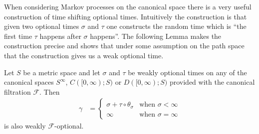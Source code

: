 When considering Markov processes on the canonical space there is a
very useful construction of time shifting optional times.  Intuitively
the construction is that given two optional times $\sigma$ and $\tau$
one constructs the random time which is ``the first time $\tau$
happens after $\sigma$ happens''.  The following Lemma makes the
construction precise and shows that under some assumption on the path
space that the construction gives us a weak optional time.
\begin{lem}\label{TimeShiftOptionalTimes}Let $S$ be a metric space and
  let $\sigma$ and $\tau$ be weakly optional times on any of the canonical
  spaces $S^\infty$, $C([0,\infty); S)$ or $D([0,\infty); S)$ provided
  with the canonical filtration $\mathcal{F}$.   Then 
\begin{align*}
\gamma &= \begin{cases}
\sigma + \tau  \circ \theta_\sigma & \text{when $\sigma<\infty$} \\
\infty & \text{when $\sigma=\infty$}
\end{cases}
\end{align*}
is also weakly $\mathcal{F}$-optional.
\end{lem}

